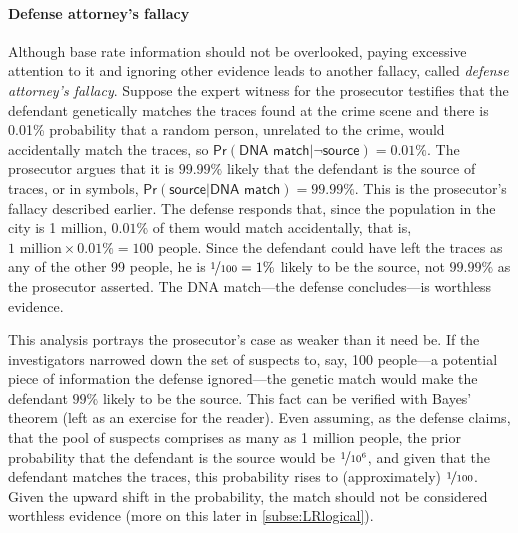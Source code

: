 \documentclass{article}
\newcommand{\pr}{\mathsf{Pr}}
\begin{document}
\paragraph{Defense attorney's fallacy} 
Although base rate information should not be overlooked, paying excessive attention to it and ignoring other evidence leads to another fallacy, called \emph{defense attorney's fallacy}. %
Suppose the expert witness for the prosecutor testifies that the defendant genetically matches the traces found at the crime scene and there is 0.01\% probability that a random person, unrelated to the crime, would accidentally  match the traces, so $\pr(\textsf{DNA match}\vert \neg\textsf{source})=0.01\%$. The prosecutor argues that it is $99.99\%$ likely that the defendant is the source of traces, or in symbols, $\pr(\textsf{source}\vert \textsf{DNA match})=99.99\%$. This is the prosecutor's fallacy described earlier. The defense responds that, since the population in the city is 1 million, $0.01\%$ of them would match accidentally, that is,  $1 \text{ million}\times 0.01\%=100$ people. Since the defendant could have left the traces as any of the other 99 people, he is $\nicefrac{1}{100}=1\%$ likely to be the source, not $99.99\%$ as the prosecutor asserted. 
The DNA match---the defense concludes---is worthless evidence.

This analysis portrays the prosecutor's case 
as weaker than it need be. 
If the investigators narrowed down the set of suspects to, say, 100 people---a potential piece of information the defense ignored---the genetic match would make the defendant $99\%$ likely to be the source. This  fact can be verified with Bayes' theorem (left as an exercise for the reader).
Even assuming, as the defense claims, that the pool of suspects comprises as many as 1 million people, the prior probability that the defendant is the source would be $\nicefrac{1}{1 0^6}$, and given that the defendant matches the traces, this probability rises to (approximately) $\nicefrac{1}{100}$.
Given the upward shift in the probability, the  match should not be considered worthless evidence (more on this later in \ref{subse:LRlogical}).  %
%
\end{document}
